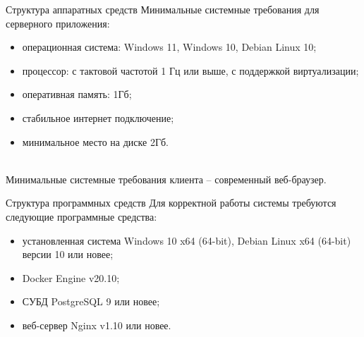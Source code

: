 \documentclass{beamer}
\begin{document}
\begin{frame}
    {Структура аппаратных средств}
    Минимальные системные требования для серверного приложения:
    \begin{itemize}
        \item операционная система: Windows 11, Windows 10, Debian Linux 10;
        \item процессор: с тактовой частотой 1 Гц или выше, с поддержкой
            виртуализации;
        \item оперативная память: 1Гб;
        \item стабильное интернет подключение;
        \item минимальное место на диске 2Гб.
    \end{itemize}
    \\[\baselineskip]

    Минимальные системные требования клиента -- современный веб-браузер.
\end{frame}

\begin{frame}
    {Структура программных средств}
    Для корректной работы системы требуются следующие программные средства:

    \begin{itemize}
        \item установленная система Windows 10 x64 (64-bit),
            Debian Linux x64 (64-bit) версии 10 или новее;
        \item Docker Engine v20.10;
        \item СУБД PostgreSQL 9 или новее;
        \item веб-сервер Nginx v1.10 или новее.
    \end{itemize}
\end{frame}
\end{document}
